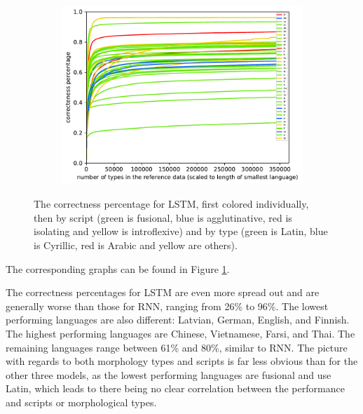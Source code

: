 \documentclass[11pt,a4paper,twoside,openright]{scrbook}
\begin{document}
\begin{figure}[h]
\begin{subfigure}[b]{0.32\textwidth}
        \includegraphics[width=\textwidth]{graphs/lstm/scripts/norm_huge_type_token_performance}
    \end{subfigure}
    \caption{The correctness percentage for LSTM, first colored individually, then by script (green is fusional, blue is agglutinative, red is isolating and yellow is introflexive) and by type (green is Latin, blue is Cyrillic, red is Arabic and yellow are others).}
	\label{Figure:lstm_norm_huge_type_token_performance}
\end{figure}

The corresponding graphs can be found in Figure \ref{Figure:lstm_norm_huge_type_token_performance}.

The correctness percentages for LSTM are even more spread out and are generally worse than those for RNN, ranging from 26\% to 96\%. The lowest performing languages are also different: Latvian, German, English, and Finnish. The highest performing languages are Chinese, Vietnamese, Farsi, and Thai. The remaining languages range between 61\% and 80\%, similar to RNN. The picture with regards to both morphology types and scripts is far less obvious than for the other three models, as the lowest performing languages are fusional and use Latin, which leads to there being no clear correlation between the performance and scripts or morphological types.
\end{document}
